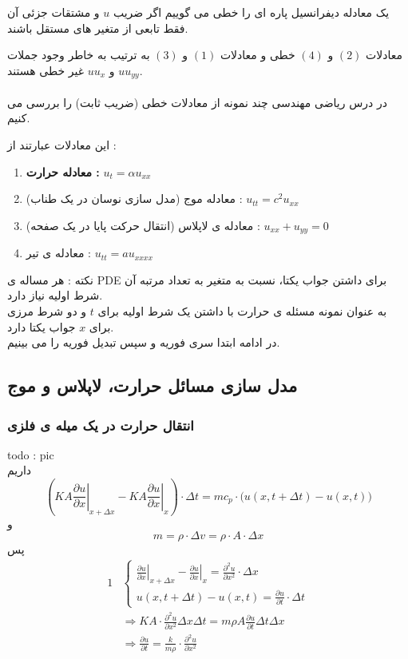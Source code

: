 \begin{definition}
 یک معادله دیفرانسیل پاره ای را خطی می گوییم اگر ضریب
 $u$
 و مشتقات جزئی آن فقط تابعی از متغیر های مستقل باشند.
\end{definition}
  معادلات
 $(2)$
 و
 $(4)$
 خطی و معادلات 
 $(1)$
 و
 $(3)$
 به ترتیب به خاطر وجود جملات
 $uu_{yy}$
 و
 $uu_x$
 غیر خطی هستند.\\
\\
 در درس ریاضی مهندسی چند نمونه از معادلات خطی (ضریب ثابت) را بررسی می کنیم.
 
 این معادلات عبارتند از :
 \begin{enumerate}
 	\item 
 	\textbf{
 	معادله حرارت : 
 }
 	$u_t=\alpha u_{xx}$
 	\item
 	معادله موج (مدل سازی نوسان در یک طناب) : 
 	$u_{tt}=c^2u_{xx}$
 	\item
 	معادله ی لاپلاس (انتقال حرکت پایا در یک صفحه) : 
 	$u_{xx}+u_{yy}=0$
 	\item
 	معادله ی تیر :
 	$u_{tt}=au_{xxxx}$
 \end{enumerate}

نکته : هر مساله ی 
PDE
برای داشتن جواب یکتا، نسبت به متغیر به تعداد مرتبه آن شرط اولیه نیاز دارد.\\
به عنوان نمونه مسئله ی حرارت با داشتن یک شرط اولیه برای 
$t$
و دو شرط مرزی برای 
$x$
جواب یکتا دارد.\\
در ادامه ابتدا سری فوریه و سپس تبدیل فوریه را می بینیم.
\subsection*{مدل سازی مسائل حرارت، لاپلاس و موج}
\subsubsection{انتقال حرارت در یک میله ی فلزی}
todo : pic\\
داریم
\[(\left.KA\frac{\partial u}{\partial x}\right|_{x+\Delta x}-\left.KA\frac{\partial u}{\partial x}\right|_{x}) \cdot \Delta t=
	mc_p \cdot \Big(u(x,t+\Delta t)-u(x,t)\Big)\]
و
\[m=\rho \cdot \Delta v=\rho \cdot  A \cdot \Delta x\]
پس
\begin{alignat*}{1}
&\begin{cases}
\left.\frac{\partial u}{\partial x}\right|_{x+\Delta x}-\left.\frac{\partial u}{\partial x}\right|_{x} = \frac{\partial^2 u}{\partial x^2}  \cdot \Delta x\\
u(x,t+\Delta t)-u(x,t)=\frac{\partial u}{\partial t} \cdot \Delta t
\end{cases} 
\\& \Rightarrow 
K A \cdot \frac{\partial^2 u}{\partial x^2}  \Delta x \Delta t=m\rho A\frac{\partial u}{\partial t}\Delta t\Delta x
\\& \Rightarrow
\frac{\partial u}{\partial t}=\frac{k}{m\rho} \cdot \frac{\partial^2 u}{\partial x^2}
\end{alignat*}

